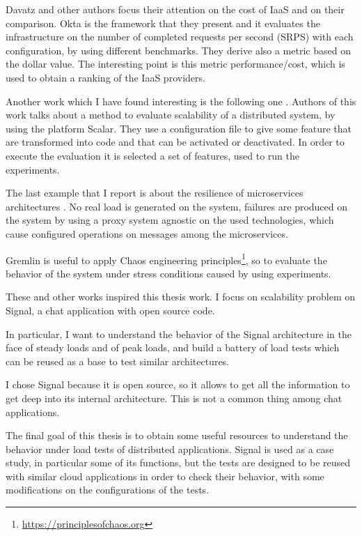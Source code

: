 Davatz and other authors \parencite{davatz2017approach} focus their attention on the cost of IaaS and on their comparison.
Okta is the framework that they present and it evaluates the infrastructure on the number of completed requests per second (SRPS) with each configuration, by using different benchmarks.
They derive also a metric based on the dollar value.
The interesting point is this metric performance/cost, which is used to obtain a ranking of the IaaS providers.

Another work which I have found interesting is the following one \parencite{preuveneers2016systematic}. Authors of this work talks about a method to evaluate scalability of a distributed system, by using the platform Scalar. They use a configuration file to give some feature that are transformed into code and that can be activated or deactivated.
In order to execute the evaluation it is selected a set of features, used to run the experiments.

The last example that I report is about the resilience of microservices architectures \parencite{heorhiadi2016gremlin}.
No real load is generated on the system, failures are produced on the system by using a proxy system agnostic on the used technologies, which cause configured operations on messages among the microservices.

Gremlin is useful to apply Chaos engineering principles\footnote{\url{https://principlesofchaos.org}}, so to evaluate the behavior of the system under stress conditions caused by using experiments.

These and other works inspired this thesis work. I focus on scalability problem on Signal, a chat application with open source code.

In particular, I want to understand the behavior of the Signal architecture in the face of steady loads and of peak loads, and build a battery of load tests which can be reused as a base to test similar architectures.

I chose Signal because it is open source, so it allows to get all the information to get deep into its internal architecture. This is not a common thing among chat applications.

The final goal of this thesis is to obtain some useful resources to understand the behavior under load tests of distributed applications.
Signal is used as a case study, in particular some of its functions, but the tests are designed to be reused with similar cloud applications in order to check their behavior, with some modifications on the configurations of the tests.

